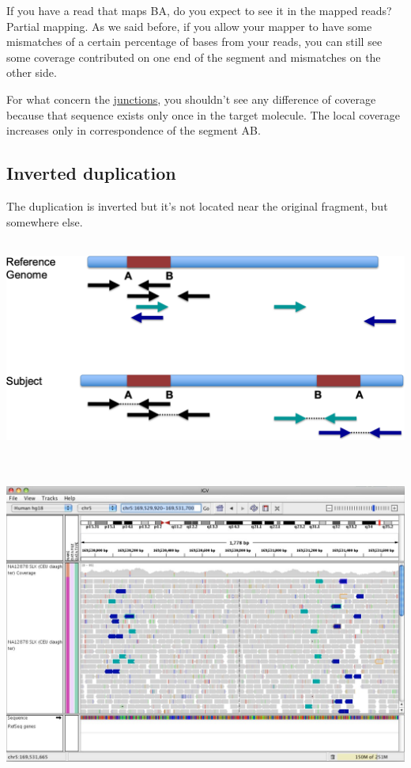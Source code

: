 If you have a read that maps BA, do you expect to see it in the mapped reads?
Partial mapping. As we said before, if you allow your mapper to have some
mismatches of a certain percentage of bases from your reads, you can still see
some coverage contributed on one end of the segment and mismatches on the other
side.

For what concern the \underline{junctions}, you shouldn't see any difference of
coverage because that sequence exists only once in the target molecule. The
local coverage increases only in correspondence of the segment AB.


\hypertarget{inverted-duplication}{%
\subsection{Inverted duplication}\label{inverted-duplication}}


The duplication is inverted but it's not located near the original fragment, but
somewhere else.

\includegraphics[width=6.11483in,height=2.82187in]{image25.png}\\


\includegraphics[width=6.29059in,height=4.34375in]{image26.jpeg}\\


